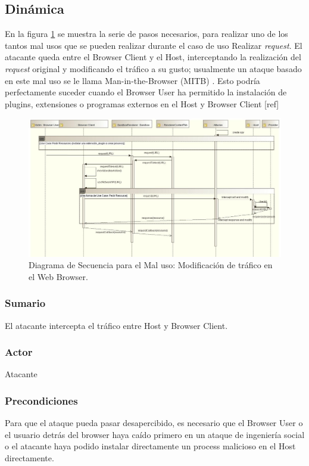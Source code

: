 \subsection{Dinámica}
En la figura \ref{fig:SeqMisuse} se muestra la serie de pasos necesarios, para realizar uno de los tantos mal usos que se pueden realizar durante el caso de uso Realizar \textit{request}. El atacante queda entre el Browser Client y el Host, interceptando la realización del \textit{request} original y modificando el tráfico a su gusto; usualmente un ataque basado en este mal uso se le llama Man-in-the-Browser (MITB) \cite{Liu2012, Barth2010, Utakrit2009, Dougan2012}. Esto podría perfectamente suceder cuando el Browser User ha permitido la instalación de plugins, extensiones o programas externos en el Host y Browser Client [ref]
\begin{figure}[h!t]
	        \centering
	        \includegraphics[scale=0.45]{figures/chap5/patronMisuseSeq.jpg}
	        \caption{Diagrama de Secuencia para el Mal uso: Modificación de tráfico en el Web Browser.}
	        \label{fig:SeqMisuse}
    \end{figure}
	
	\subsubsection{Sumario} El atacante intercepta el tráfico entre Host y Browser Client.
	\subsubsection{Actor} Atacante
	\subsubsection{Precondiciones} Para que el ataque pueda pasar desapercibido, es necesario que el Browser User o el usuario detrás del browser haya caído primero en un ataque de ingeniería social o el atacante haya podido instalar directamente un process malicioso en el Host directamente.
